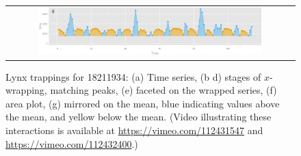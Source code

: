 \documentclass[12pt]{article}
\begin{document}
\begin{figure}[htp]
\begin{center}
\begin{tabular}{cc}
\multicolumn{2}{c}{\includegraphics[width=0.8\textwidth]{graph/pipeline-18-mirrored}} \\
\end{tabular}
\caption{\label{fig:x-wrapping}Lynx trappings for 1821\textendash{}1934:
(a) Time series, (b \textendash{} d) stages of $x$-wrapping, matching
peaks, (e) faceted on the wrapped series, (f) area plot, (g) mirrored
on the mean, blue indicating values above the mean, and yellow below
the mean.  (Video illustrating these interactions is available at
\url{https://vimeo.com/112431547} and \url{https://vimeo.com/112432400}.)}
\end{center}
\end{figure}
\end{document}
